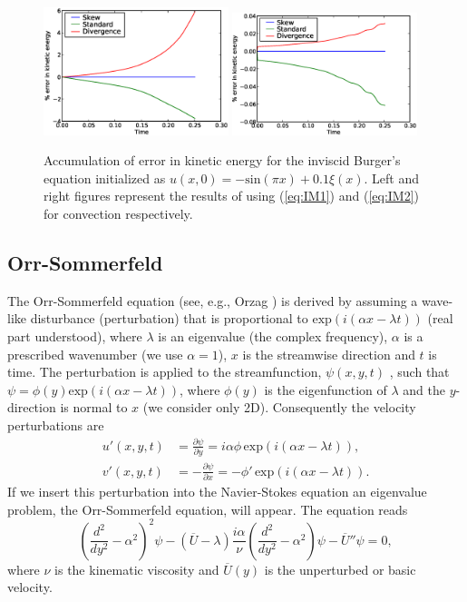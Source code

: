 \begin{figure}
 \includegraphics[width=0.48\textwidth]{chapters/mortensen/Burgers_KE_IM1.eps}
 \includegraphics[width=0.48\textwidth]{chapters/mortensen/Burgers_KE_IM2.eps}
 \caption{
Accumulation of error in kinetic energy for the inviscid Burger's equation initialized as $u(x,0)=-\text{sin}(\pi x)+0.1 \xi(x)$. Left and right figures represent the results of using (\ref{eq:IM1}) and (\ref{eq:IM2}) for convection respectively.
}
\label{fig:burgers_KE}
\end{figure}

\subsection{Orr-Sommerfeld}
\label{sec:OS}
The Orr-Sommerfeld equation (see, e.g., Orzag \cite{orzag71}) is derived by assuming a wave-like disturbance (perturbation) that is proportional to $\text{exp}(i(\alpha x-\lambda t))$ (real part understood), where $\lambda$ is an eigenvalue (the complex frequency), $\alpha$ is a prescribed wavenumber (we use $\alpha=1$), $x$ is the streamwise direction and $t$ is time. The perturbation is applied to the streamfunction, $\psi(x,y,t)$ , such that $\psi=\phi(y) \text{exp}(i(\alpha x- \lambda t))$, where $\phi(y)$ is the eigenfunction of $\lambda$ and the $y$-direction is normal to $x$ (we consider only 2D). Consequently the velocity perturbations are
\begin{align}
 u'(x,y,t)&=\frac{\partial \psi}{\partial y}=i\alpha \phi \, \text{exp}(i(\alpha x- \lambda t)),\\
 v'(x,y,t)&=-\frac{\partial \psi}{\partial x}=-\phi' \, \text{exp}(i(\alpha x- \lambda t)).
\end{align}
If we insert this perturbation into the Navier-Stokes equation an eigenvalue problem, the Orr-Sommerfeld equation, will appear. The equation reads
\begin{equation}
 \left( \frac{d^2}{dy^2}-\alpha^2\right)^2\psi - \left(\overline{U}-\lambda \right) \frac{i \alpha}{\nu} \left( \frac{d^2}{dy^2}-\alpha^2\right)\psi - \overline{U}''\psi=0,
 \label{eq:OrrS}
\end{equation}
where $\nu$ is the kinematic viscosity and $\overline{U}(y)$ is the unperturbed or basic velocity.

